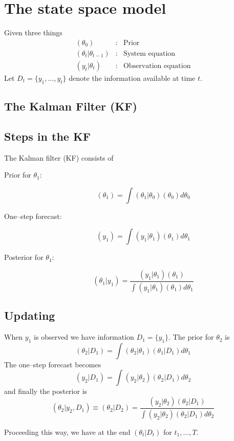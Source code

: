 \section{The state space model}
\label{KFapp}

Given three things
\begin{eqnarray*}
  (\theta_0) &:& \mbox{Prior}\\
  (\theta_t|\theta_{t-1}) &:& \mbox{System equation}\\
  (y_t|\theta_t) &:& \mbox{Observation equation}
\end{eqnarray*}
Let $D_t=\{y_1, \dots, y_t\}$ denote the information
available at time $t$.

\subsection{The Kalman Filter (KF)}


\subsection{Steps in the KF}

The Kalman filter (KF) consists of
\begin{description}
\item[Prior for $\theta_1$:] 
  $$
  (\theta_1) = \int(\theta_1|\theta_0)(\theta_0)d\theta_0
  $$

\item[One--step forecast:] 
  $$
  (y_1) = \int(y_1|\theta_1)(\theta_1)d\theta_1
  $$

\item[Posterior for $\theta_1$:] 
  $$
  (\theta_1|y_1) = \frac{(y_1|\theta_1)(\theta_1)}
  {\int(y_1|\theta_1)(\theta_1)d\theta_1}
  $$
\end{description}

\subsection{Updating}

When $y_1$ is observed we have information $D_1=\{y_1\}$. The prior
for $\theta_2$ is
  $$
  (\theta_2|D_1) = \int(\theta_2|\theta_1)(\theta_1|D_1)d\theta_1
  $$
The one--step forecast becomes
  $$
  (y_2|D_1) = \int(y_2|\theta_2)(\theta_2|D_1)d\theta_2
  $$
and finally the posterior is
  $$
  (\theta_2|y_2,D_1) \equiv (\theta_2|D_2) = 
  \frac{(y_2|\theta_2)(\theta_2|D_1)}
  {\int(y_2|\theta_2)(\theta_2|D_1)d\theta_2}
  $$

Proceeding this way, we have at the end $(\theta_t|D_t)$ for
$t_1,\dots, T$.


